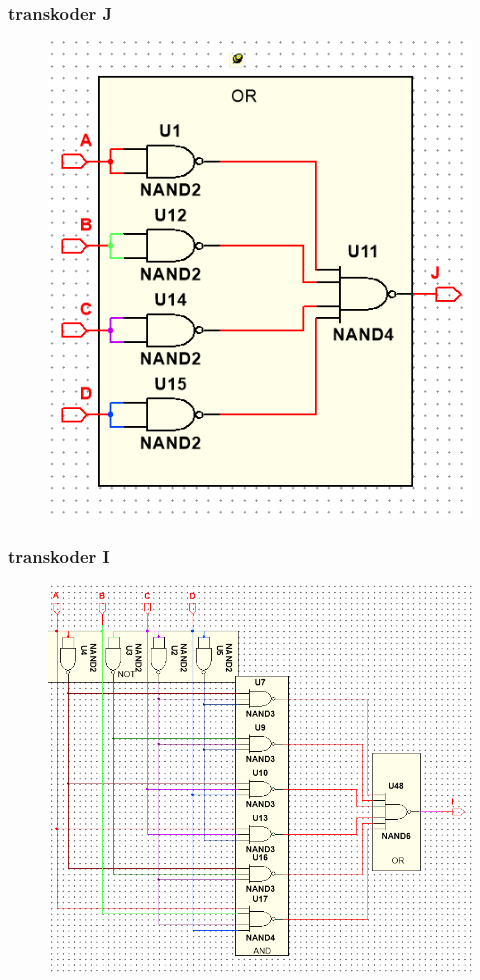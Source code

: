 \documentclass[a4paper]{article}
\begin{document}
 \subsubsection{transkoder J}
 \begin{figure}[H]
  \centering
  \includegraphics{schemat_J.png}
\end{figure}

\subsubsection{transkoder I}
\begin{figure}[H]
 \centering
 \includegraphics{schemat_I.png}
\end{figure}
\end{document}
